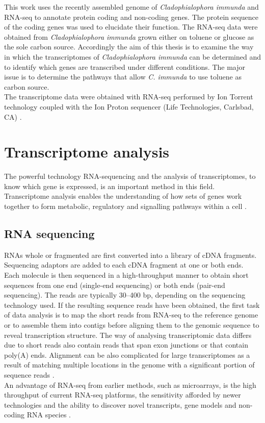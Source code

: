\documentclass[12pt, a4paper]{report}
\begin{document}
This work uses the recently assembled genome of \textit{Cladophialophora immunda} and RNA-seq to annotate protein coding and non-coding genes. The protein sequence of the coding genes was used to elucidate their function. The RNA-seq data were obtained from \textit{Cladophialophora immunda} grown either on toluene or glucose as the sole carbon source. 
Accordingly the aim of this thesis is to examine the way in which the transcriptomes of \textit{Cladophialophora immunda} can be determined and to identify which genes are transcribed under different conditions. The major issue is to determine the pathways that allow \textit{C. immunda} to use toluene as carbon source.\\ 
The transcriptome data were obtained with RNA-seq performed by Ion Torrent technology coupled with the Ion Proton sequencer (Life Technologies, Carlsbad, CA) \cite{BarbaraBlasi2015}. 

\section{Transcriptome analysis}
The powerful technology RNA-sequencing and the analysis of transcriptomes, to know which gene is expressed, is an important method in this field. Transcriptome analysis enables the understanding of how sets of genes work together to form metabolic, regulatory and signalling pathways within a cell \cite{Xiong2006}.  
\subsection{RNA sequencing}
RNAs whole or fragmented are first converted into a library of cDNA fragments. Sequencing adaptors are added to each cDNA fragment at one or both ends. Each molecule is then sequenced in a high-throughput manner to obtain short sequences from one end (single-end sequencing) or both ends (pair-end sequencing). The reads are typically 30–400 bp, depending on the sequencing technology used. If the resulting sequence reads have been obtained, the first task of data analysis is to map the short reads from RNA-seq to the reference genome or to assemble them into contigs before aligning them to the genomic sequence to reveal transcription structure. The way of analysing transcriptomic data differs due to short reads also contain reads that span exon junctions or that contain poly(A) ends. Alignment can be also complicated for large transcriptomes as a result of matching multiple locations in the genome with a significant portion of sequence reads \cite{Wang2010}.  \\
An advantage of RNA-seq from earlier methods, such as microarrays, is the high throughput of current RNA-seq platforms, the sensitivity afforded by newer technologies and the ability to discover novel transcripts, gene models and non-coding RNA species \cite{Korpelainen2014}.  \\
\end{document}
